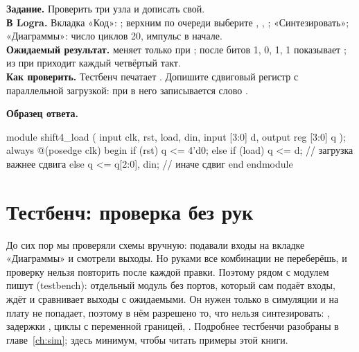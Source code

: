 \begin{diybox}
\textbf{Задание.} Проверить три узла и дописать свой.\\
\textbf{В Logra.} Вкладка «Код»: ; верхним по очереди выберите
, , ; «Синтезировать»; «Диаграммы»:
число циклов 20, импульс  в начале.\\
\textbf{Ожидаемый результат.}  меняет  только при
;  после битов 1, 0, 1, 1 показывает ;
 из  при  приходит каждый четвёртый такт.\\
\textbf{Как проверить.} Тестбенч  печатает .
 Допишите сдвиговый регистр с параллельной загрузкой: при
 в него записывается слово .
\end{diybox}

\textbf{Образец ответа.}\par\nopagebreak
\begin{vcode}
module shift4_load (
    input            clk, rst, load, din,
    input      [3:0] d,
    output reg [3:0] q
);
    always @(posedge clk) begin
        if (rst)       q <= 4'd0;
        else if (load) q <= d;                // загрузка важнее сдвига
        else           q <= {q[2:0], din};    // иначе сдвиг
    end
endmodule
\end{vcode}


\section{Тестбенч: проверка без рук}
\label{sec:v-tb}

До сих пор мы проверяли схемы вручную: подавали входы на вкладке
«Диаграммы» и смотрели выходы. Но руками все комбинации не переберёшь, и
проверку нельзя повторить после каждой правки. Поэтому рядом с модулем пишут
 (testbench): отдельный модуль без портов, который сам подаёт
входы, ждёт и сравнивает выходы с ожидаемыми. Он нужен только в симуляции и
на плату не попадает, поэтому в нём разрешено то, что нельзя синтезировать:
, задержки \code{\#}, циклы с переменной границей,
. Подробнее тестбенчи разобраны в главе~\ref{ch:sim}; здесь
минимум, чтобы читать примеры этой книги.


